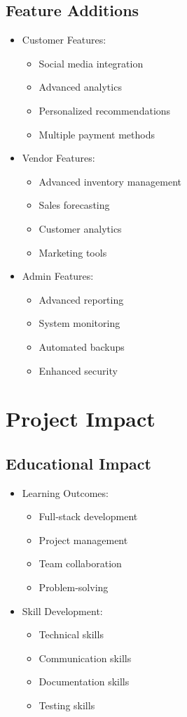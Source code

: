 \subsection{Feature Additions}
\begin{itemize}
    \item Customer Features:
    \begin{itemize}
        \item Social media integration
        \item Advanced analytics
        \item Personalized recommendations
        \item Multiple payment methods
    \end{itemize}
    \item Vendor Features:
    \begin{itemize}
        \item Advanced inventory management
        \item Sales forecasting
        \item Customer analytics
        \item Marketing tools
    \end{itemize}
    \item Admin Features:
    \begin{itemize}
        \item Advanced reporting
        \item System monitoring
        \item Automated backups
        \item Enhanced security
    \end{itemize}
\end{itemize}

\section{Project Impact}
\subsection{Educational Impact}
\begin{itemize}
    \item Learning Outcomes:
    \begin{itemize}
        \item Full-stack development
        \item Project management
        \item Team collaboration
        \item Problem-solving
    \end{itemize}
    \item Skill Development:
    \begin{itemize}
        \item Technical skills
        \item Communication skills
        \item Documentation skills
        \item Testing skills
    \end{itemize}
\end{itemize}

